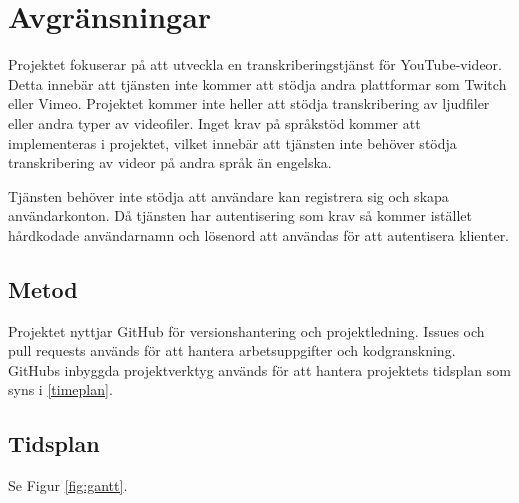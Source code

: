\section{Avgränsningar}
\label{sec:limitations}
Projektet fokuserar på att utveckla en transkriberingstjänst för
YouTube-videor. Detta innebär att tjänsten inte kommer att stödja andra
plattformar som Twitch eller Vimeo. Projektet kommer inte heller att stödja
transkribering av ljudfiler eller andra typer av videofiler. Inget krav på
språkstöd kommer att implementeras i projektet, vilket innebär att tjänsten
inte behöver stödja transkribering av videor på andra språk än engelska.

Tjänsten behöver inte stödja att användare kan registrera sig och skapa
användarkonton. Då tjänsten har autentisering som krav så kommer istället
hårdkodade användarnamn och lösenord att användas för att autentisera
klienter.

\subsection{Metod}
\label{sec:method}
Projektet nyttjar GitHub för versionshantering och projektledning. Issues och
pull requests används för att hantera arbetsuppgifter och kodgranskning. 
GitHubs inbyggda projektverktyg används för att hantera projektets tidsplan 
som syns i \ref{timeplan}. 

\subsection{Tidsplan}
\label{sec:timeplan}
Se Figur \ref{fig:gantt}.
